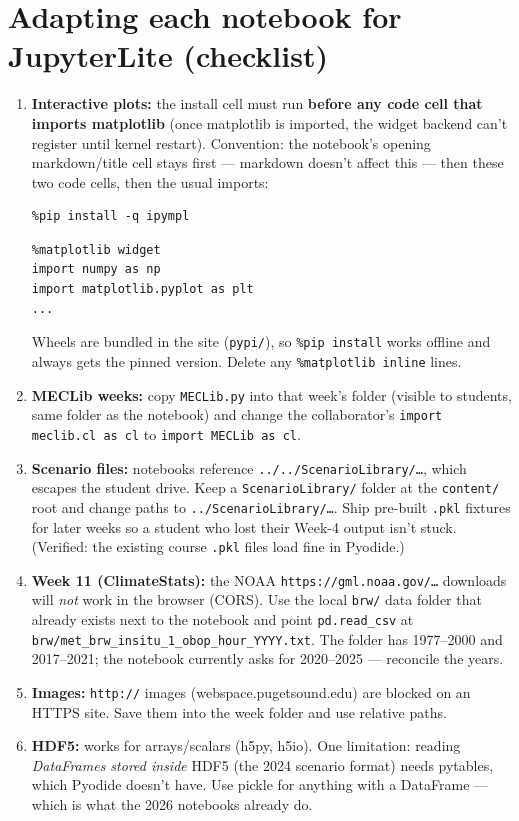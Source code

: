 \documentclass[11pt]{article}
\newcommand{\code}[1]{\texttt{\small #1}}
\begin{document}
\section{Adapting each notebook for JupyterLite (checklist)}

\begin{enumerate}[itemsep=4pt]
  \item \textbf{Interactive plots:} the install cell must run \textbf{before
    any code cell that imports matplotlib} (once matplotlib is imported, the
    widget backend can't register until kernel restart). Convention: the
    notebook's opening markdown/title cell stays first --- markdown doesn't
    affect this --- then these two code cells, then the usual imports:
\begin{lstlisting}
%pip install -q ipympl
\end{lstlisting}
\begin{lstlisting}
%matplotlib widget
import numpy as np
import matplotlib.pyplot as plt
...
\end{lstlisting}
    Wheels are bundled in the site (\code{pypi/}), so \code{\%pip install}
    works offline and always gets the pinned version. Delete any
    \code{\%matplotlib inline} lines.
  \item \textbf{MECLib weeks:} copy \code{MECLib.py} into that week's folder
    (visible to students, same folder as the notebook) and change the
    collaborator's \code{import meclib.cl as cl} to \code{import MECLib as cl}.
  \item \textbf{Scenario files:} notebooks reference
    \code{../../ScenarioLibrary/\ldots}, which escapes the student drive. Keep
    a \code{ScenarioLibrary/} folder at the \code{content/} root and change
    paths to \code{../ScenarioLibrary/\ldots}. Ship pre-built \code{.pkl}
    fixtures for later weeks so a student who lost their Week-4 output isn't
    stuck. (Verified: the existing course \code{.pkl} files load fine in
    Pyodide.)
  \item \textbf{Week 11 (ClimateStats):} the NOAA
    \code{https://gml.noaa.gov/\ldots} downloads will \emph{not} work in the
    browser (CORS). Use the local \code{brw/} data folder that already exists
    next to the notebook and point \code{pd.read\_csv} at
    \code{brw/met\_brw\_insitu\_1\_obop\_hour\_YYYY.txt}. The folder has
    1977--2000 and 2017--2021; the notebook currently asks for 2020--2025 ---
    reconcile the years.
  \item \textbf{Images:} \code{http://} images (webspace.pugetsound.edu) are
    blocked on an HTTPS site. Save them into the week folder and use relative
    paths.
  \item \textbf{HDF5:} works for arrays/scalars (h5py, h5io). One limitation:
    reading \emph{DataFrames stored inside} HDF5 (the 2024 scenario format)
    needs pytables, which Pyodide doesn't have. Use pickle for anything with a
    DataFrame --- which is what the 2026 notebooks already do.
\end{enumerate}
\end{document}
